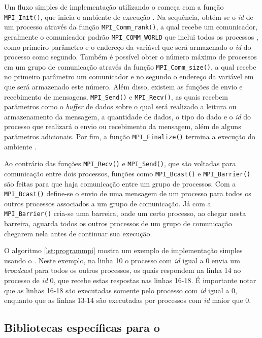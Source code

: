 Um fluxo simples de implementação utilizando o \MPI começa com a função \texttt{MPI\_Init()}, que inicia o ambiente de execução \MPI. Na sequência, obtém-se o \textit{id} de um processo através da função \texttt{MPI\_Comm\_rank()}, a qual recebe um comunicador, geralmente o comunicador padrão \texttt{MPI\_COMM\_WORLD} que inclui todos os processos \MPI, como primeiro parâmetro e o endereço da variável que será armazenado o \textit{id} do processo como segundo. Também é possível obter o número máximo de processos em um grupo de comunicação através da função \texttt{MPI\_Comm\_size()}, a qual recebe no primeiro parâmetro um comunicador e no segundo o endereço da variável em que será armazenado este número. Além disso, existem as funções de envio e recebimento de mensagens, \texttt{MPI\_Send()} e \texttt{MPI\_Recv()}, as quais recebem parâmetros como o \textit{buffer} de dados sobre o qual será realizado a leitura ou armazenamento da mensagem, a quantidade de dados, o tipo do dado e o \textit{id} do processo que realizará o envio ou recebimento da mensagem, além de alguns parâmetros adicionais. Por fim, a função \texttt{MPI\_Finalize()} termina a execução do ambiente \MPI.

Ao contrário das funções \texttt{MPI\_Recv()} e \texttt{MPI\_Send()}, que são voltadas para comunicação entre dois processos, funções como \texttt{MPI\_Bcast()} e \texttt{MPI\_Barrier()} são feitas para que haja comunicação entre um grupo de processos. Com a \texttt{MPI\_Bcast()} define-se o envio de uma mensagem de um processo para todos os outros processos associados a um grupo de comunicação. Já com a \texttt{MPI\_Barrier()} cria-se uma barreira, onde um certo processo, ao chegar nesta barreira, aguarda todos os outros processos de um grupo de comunicação chegarem nela antes de continuar sua execução.

O algoritmo \ref{lst:programmpi} mostra um exemplo de implementação simples usando o \MPI. Neste exemplo, na linha 10 o processo com \textit{id} igual a 0 envia um \textit{broadcast} para todos os outros processos, os quais respondem na linha 14 ao processo de \textit{id} 0, que recebe estas respostas nas linhas 16-18. É importante notar que as linhas 16-18 são executadas somente pelo processo com \textit{id} igual a 0, enquanto que as linhas 13-14 são executadas por processos com \textit{id} maior que 0.

\subsection{Bibliotecas específicas para o \mppa}
\label{sec:bibliotecasespecificasmppa}

